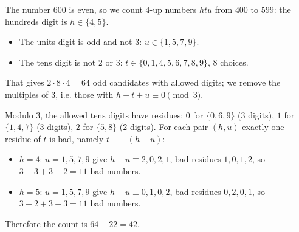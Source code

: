 The number $600$ is even, so we count $4$-up numbers $\overline{htu}$ from $400$ to $599$: the hundreds digit is $h\in\{4,5\}$.
\begin{itemize}
\item The units digit is odd and not $3$: $u\in\{1,5,7,9\}$.
\item The tens digit is not $2$ or $3$: $t\in\{0,1,4,5,6,7,8,9\}$, $8$ choices.
\end{itemize}
That gives $2\cdot8\cdot4=64$ odd candidates with allowed digits; we remove the multiples of $3$, i.e. those with $h+t+u\equiv0\pmod 3$.

Modulo $3$, the allowed tens digits have residues: $0$ for $\{0,6,9\}$ ($3$ digits), $1$ for $\{1,4,7\}$ ($3$ digits), $2$ for $\{5,8\}$ ($2$ digits). For each pair $(h,u)$ exactly one residue of $t$ is bad, namely $t\equiv-(h+u)$:
\begin{itemize}
\item $h=4$: $u=1,5,7,9$ give $h+u\equiv2,0,2,1$, bad residues $1,0,1,2$, so $3+3+3+2=11$ bad numbers.
\item $h=5$: $u=1,5,7,9$ give $h+u\equiv0,1,0,2$, bad residues $0,2,0,1$, so $3+2+3+3=11$ bad numbers.
\end{itemize}
Therefore the count is $64-22=\boxed{42}$.
